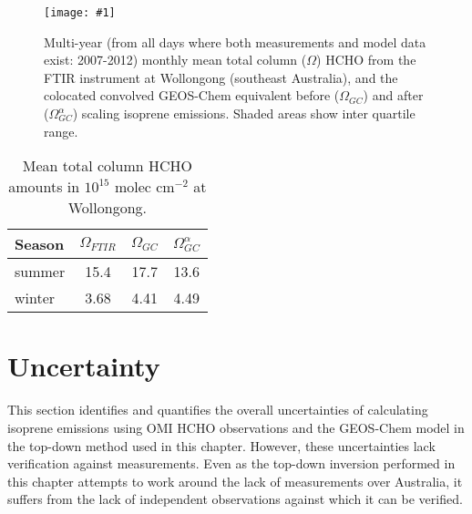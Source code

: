 \documentclass[acp, manuscript]{copernicus}
\newcommand{\mypic}[3]{%
  \begin{figure}
    \texttt{[image: \#1]}
    \caption{#2}
    #3
  \end{figure}
}
\begin{document}
    \mypic{Figures/FTIR_TC_Comparison_MYA.png}{%
      Multi-year (from all days where both measurements and model data exist: 2007-2012) monthly mean total column ($\Omega$) HCHO from the FTIR instrument at Wollongong (southeast Australia), and the colocated convolved GEOS-Chem equivalent before ($\Omega_{GC}$) and after ($\Omega_{GC}^{\alpha}$) scaling isoprene emissions.
      Shaded areas show inter quartile range.
    }{\label{BioIsop:results:measurements:fig_FTIR_Comparison_MYA}}
  
    \begin{table}\begin{threeparttable}
      \caption{Mean total column HCHO amounts in $10^{15}$ molec cm$^{-2}$ at Wollongong.}
      \begin{tabular}{ l | c c c } 
        \toprule
        Season & $\Omega_{FTIR}$ & $\Omega_{GC}$ &  $\Omega_{GC}^{\alpha}$  \\
        \midrule
        summer & 15.4 & 17.7 & 13.6 \\
        winter & 3.68 & 4.41 & 4.49 \\
        \bottomrule
      \end{tabular}
      \label{BioIsop:results:measurements:tab_uncertainties}
    \end{threeparttable}\end{table}
  
  
\section{Uncertainty}
\label{BioIsop:uncertainty}
  
  
  This section identifies and quantifies the overall uncertainties of calculating isoprene emissions using OMI HCHO observations and the GEOS-Chem model in the top-down method used in this chapter.
  However, these uncertainties lack verification against measurements.
  Even as the top-down inversion performed in this chapter attempts to work around the lack of measurements over Australia, it suffers from the lack of independent observations against which it can be verified.
  
\end{document}
